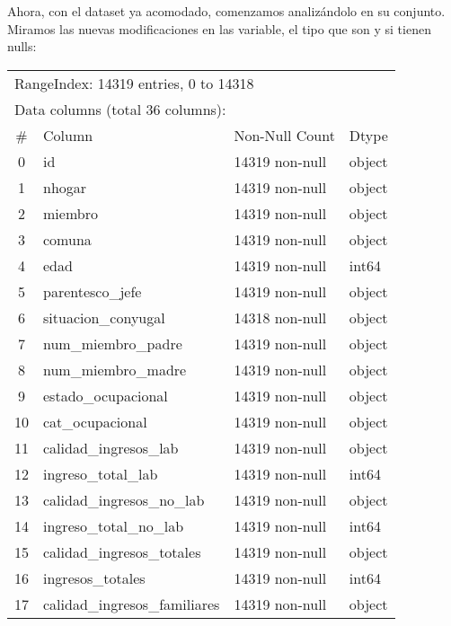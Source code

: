 \documentclass[a4paper]{article}
\begin{document}
    Ahora, con el dataset ya acomodado, comenzamos analizándolo en su conjunto.    Miramos las nuevas modificaciones en las variable, el tipo que son y si tienen nulls:
    \begin{table}[H]\begin{center}
    \begin{tabular}{clll}
        \multicolumn{4}{l}{RangeIndex: 14319 entries, 0 to 14318} \\
        \multicolumn{4}{l}{Data columns (total 36 columns):} \\
        \#  & Column                     & Non-Null Count & Dtype \\ \hline
        0 & id                           & 14319 non-null & object \\
        1 & nhogar                       & 14319 non-null & object \\
        2 &  miembro                     & 14319 non-null & object \\ 
        3 &  comuna                      & 14319 non-null & object  \\
        4 &  edad                        & 14319 non-null & int64   \\
        5 &  parentesco\_jefe             & 14319 non-null & object  \\
        6 &  situacion\_conyugal          & 14318 non-null & object  \\
        7 &  num\_miembro\_padre           & 14319 non-null & object  \\
        8 &  num\_miembro\_madre           & 14319 non-null & object  \\
        9 &  estado\_ocupacional          & 14319 non-null & object  \\
        10 &  cat\_ocupacional            & 14319 non-null & object  \\
        11 & calidad\_ingresos\_lab        & 14319 non-null & object  \\
        12 & ingreso\_total\_lab           & 14319 non-null & int64   \\
        13 & calidad\_ingresos\_no\_lab     & 14319 non-null & object  \\
        14 & ingreso\_total\_no\_lab        & 14319 non-null & int64   \\
        15 & calidad\_ingresos\_totales    & 14319 non-null & object  \\
        16 & ingresos\_totales            & 14319 non-null & int64   \\
        17 & calidad\_ingresos\_familiares & 14319 non-null & object  \\

\end{tabular}
\end{center}
\end{table}
\end{document}
